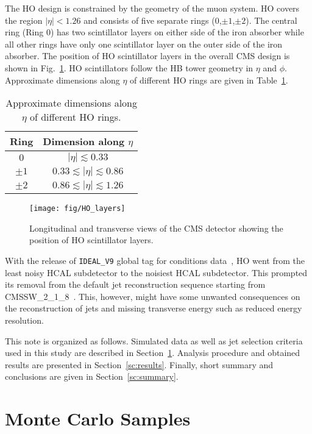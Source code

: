 \documentclass{cmspaper}
\begin{document}
The HO design is constrained by the geometry of the muon system. HO covers the region $|\eta|<1.26$ and consists of five separate rings ($0$,$\pm 1$,$\pm 2$). The central ring (Ring $0$) has two scintillator layers on either side of the iron absorber while all other rings have only one scintillator layer on the outer side of the iron absorber. The position of HO scintillator layers in the overall CMS design is shown in Fig.~\ref{fig:HO_layers}. HO scintillators follow the HB tower geometry in $\eta$ and $\phi$. Approximate dimensions along $\eta$ of different HO rings are given in Table~\ref{tab:ring_dim}.
\begin{table}[h]
 \caption{Approximate dimensions along $\eta$ of different HO rings.}
 \centering
 \begin{tabular}{c|c}
  Ring    & Dimension along $\eta$ \\ \hline \hline
  $0$     & $|\eta|\lesssim0.33$ \\ \hline
  $\pm 1$ & $0.33\lesssim|\eta|\lesssim 0.86$ \\ \hline
  $\pm 2$ & $0.86\lesssim|\eta|\lesssim 1.26$
 \end{tabular}
 \label{tab:ring_dim}
\end{table}

\begin{figure}[b]
 \centering
 \texttt{[image: fig/HO\_layers]}
 \caption{Longitudinal and transverse views of the CMS detector showing the position of HO scintillator layers.}
 \label{fig:HO_layers}
\end{figure}

With the release of \texttt{IDEAL\_V9} global tag for conditions data~\cite{ref:frontier}, HO went from the least noisy HCAL subdetector to the noisiest HCAL subdetector. This prompted its removal from the default jet reconstruction sequence starting from CMSSW\_2\_1\_8~\cite{ref:cmssw}. This, however, might have some unwanted consequences on the reconstruction of jets and missing transverse energy such as reduced energy resolution. 

This note is organized as follows. Simulated data as well as jet selection criteria used in this study are described in Section~\ref{sc:mc_samples}. Analysis procedure and obtained results are presented in Section~\ref{sc:results}. Finally, short summary and conclusions are given in Section~\ref{sc:summary}.


\section{Monte Carlo Samples}
\label{sc:mc_samples}
\end{document}
